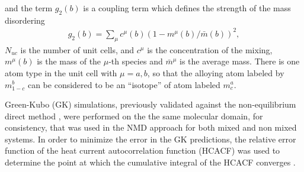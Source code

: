 \documentclass[aps,prb,preprint,preprintnumbers,amsmath,amssymb,floatfix,superscriptaddress]{revtex4}
\begin{document}
and the term $g_2(b)$ is a coupling term which defines the strength of the mass disordering
\begin{equation}\label{EQ:g(b)}
\begin{split}
g_2(b) = \sum_\mu c^{\mu}(b)(1-m^{\mu}(b)/\bar{m}(b))^2, 
\end{split}
\end{equation}
$N_{uc}$ is the number of unit cells, and $c^\mu$ is the concentration of the mixing, $m^\mu(b)$ is the mass of the $\mu$-th species and $\bar{m}^{\mu}$ is the average mass. There is one atom type in the unit cell with $\mu=a,b$, so that the alloying atom labeled by $m^b_{1-c}$ can be considered to be an ``isotope'' of atom labeled $m^a_{c}$. 

Green-Kubo (GK) simulations, previously validated against the non-equilibrium direct method \cite {PhysRevB.79.075316}, were performed on the the same molecular domain, for consistency, that was used in the NMD approach for both mixed and non mixed systems. In order to minimize the error in the GK predictions, the relative error function of the heat current autocorrelation function (HCACF) was used to determine the point at which the cumulative integral of the HCACF converges \cite{Chen20102392}.
\end{document}
